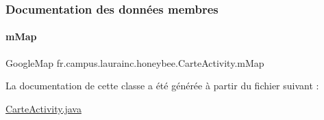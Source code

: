 \subsubsection{Documentation des données membres}
\mbox{\label{classfr_1_1campus_1_1laurainc_1_1honeybee_1_1_carte_activity_a101cebc8274b075aa3fee06ce55bf2fd}} 
\paragraph{\texorpdfstring{m\+Map}{mMap}}
{\footnotesize\ttfamily Google\+Map fr.\+campus.\+laurainc.\+honeybee.\+Carte\+Activity.\+m\+Map\hspace{0.3cm}{\ttfamily [private]}}



La documentation de cette classe a été générée à partir du fichier suivant \+:\begin{DoxyCompactItemize}
\item 
\hyperlink{_carte_activity_8java}{Carte\+Activity.\+java}\end{DoxyCompactItemize}
